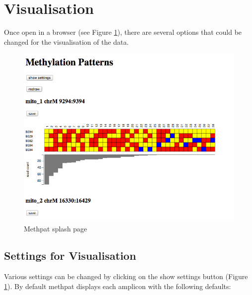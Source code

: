 \documentclass[11pt,a4paper]{article}
\begin{document}
\section{Visualisation}
Once open in a browser (see Figure \ref{fig:methpat1}), there are several options that could be changed for the visualisation of the data.
\begin{figure}[H] %
   \centering
   \includegraphics[scale=0.65]{images/methpat001.png} 
   \caption{Methpat splash page}
   \label{fig:methpat1}
\end{figure}

\subsection{Settings for Visualisation}
Various settings can be changed by clicking on the show settings button (Figure \ref{fig:methpat1}). By default methpat displays each amplicon with the following defaults:
\end{document}
